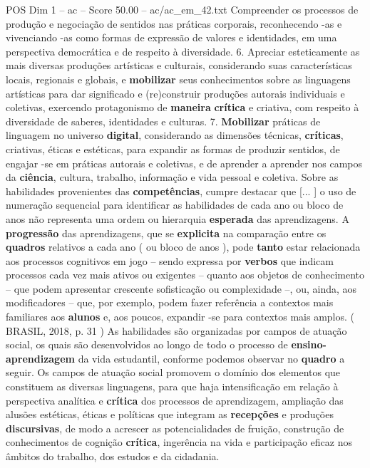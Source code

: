 \begin{textsample}{POS Dim 1 – ac – Score 50.00 – ac/ac\_em\_42.txt}
Compreender os processos de produção e negociação de sentidos nas práticas corporais, reconhecendo -as e vivenciando -as como formas de expressão de valores e identidades, em uma perspectiva democrática e de respeito à diversidade. 6.
Apreciar esteticamente as mais diversas produções artísticas e culturais, considerando suas características locais, regionais e globais, e \textbf{mobilizar} seus conhecimentos sobre as linguagens artísticas para dar significado e (re)construir produções autorais individuais e coletivas, exercendo protagonismo de \textbf{maneira} \textbf{crítica} e criativa, com respeito à diversidade de saberes, identidades e culturas. 7. \textbf{Mobilizar} práticas de linguagem no universo \textbf{digital}, considerando as dimensões técnicas, \textbf{críticas}, criativas, éticas e estéticas, para expandir as formas de produzir sentidos, de engajar -se em práticas autorais e coletivas, e de aprender a aprender nos campos da \textbf{ciência}, cultura, trabalho, informação e vida pessoal e coletiva.
Sobre as habilidades provenientes das \textbf{competências}, cumpre destacar que [... ] o uso de numeração sequencial para identificar as habilidades de cada ano ou bloco de anos não representa uma ordem ou hierarquia \textbf{esperada} das aprendizagens.
A \textbf{progressão} das aprendizagens, que se \textbf{explicita} na comparação entre os \textbf{quadros} relativos a cada ano ( ou bloco de anos ), pode \textbf{tanto} estar relacionada aos processos cognitivos em jogo – sendo expressa por \textbf{verbos} que indicam processos cada vez mais ativos ou exigentes – quanto aos objetos de conhecimento – que podem apresentar crescente sofisticação ou complexidade –, ou, ainda, aos modificadores – que, por exemplo, podem fazer referência a contextos mais familiares aos \textbf{alunos} e, aos poucos, expandir -se para contextos mais amplos. ( BRASIL, 2018, p. 31 ) As habilidades são organizadas por campos de atuação social, os quais são desenvolvidos ao longo de todo o processo de \textbf{ensino-aprendizagem} da vida estudantil, conforme podemos observar no \textbf{quadro} a seguir.
Os campos de atuação social promovem o domínio dos elementos que constituem as diversas linguagens, para que haja intensificação em relação à perspectiva analítica e \textbf{crítica} dos processos de aprendizagem, ampliação das alusões estéticas, éticas e políticas que integram as \textbf{recepções} e produções \textbf{discursivas}, de modo a acrescer as potencialidades de fruição, construção de conhecimentos de cognição \textbf{crítica}, ingerência na vida e participação eficaz nos âmbitos do trabalho, dos estudos e da cidadania.

\end{textsample}

